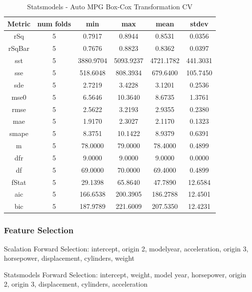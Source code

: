 \documentclass{article}
\begin{document}
\begin{table}[H]
\centering
\caption{Statsmodels - Auto MPG Box-Cox Transformation CV}
\label{tab:Statsmodels - Auto MPG Box-Cox Transformation CV}
\begin{tabular}{|c|c|c|c|c|c|}\hline
Metric & num folds & min & max & mean & stdev \\ \hline \hline
rSq & 5 & 0.7917 & 0.8944 & 0.8531 & 0.0356 \\ \hline
rSqBar & 5 & 0.7676 & 0.8823 & 0.8362 & 0.0397 \\ \hline
sst & 5 & 3880.9704 & 5093.9237 & 4721.1782 & 441.3031 \\ \hline
sse & 5 & 518.6048 & 808.3934 & 679.6400 & 105.7450 \\ \hline
sde & 5 & 2.7219 & 3.4228 & 3.1201 & 0.2536 \\ \hline
mse0 & 5 & 6.5646 & 10.3640 & 8.6735 & 1.3761 \\ \hline
rmse & 5 & 2.5622 & 3.2193 & 2.9355 & 0.2380 \\ \hline
mae & 5 & 1.9170 & 2.3027 & 2.1170 & 0.1323 \\ \hline
smape & 5 & 8.3751 & 10.1422 & 8.9379 & 0.6391 \\ \hline
m & 5 & 78.0000 & 79.0000 & 78.4000 & 0.4899 \\ \hline
dfr & 5 & 9.0000 & 9.0000 & 9.0000 & 0.0000 \\ \hline
df & 5 & 69.0000 & 70.0000 & 69.4000 & 0.4899 \\ \hline
fStat & 5 & 29.1398 & 65.8640 & 47.7890 & 12.6584 \\ \hline
aic & 5 & 166.6538 & 200.3905 & 186.2788 & 12.4501 \\ \hline
bic & 5 & 187.9789 & 221.6009 & 207.5350 & 12.4231 \\ \hline
\end{tabular}
\end{table}

\subsubsection{Feature Selection}

Scalation Forward Selection: intercept, origin 2, modelyear, acceleration, origin 3, horsepower, displacement, cylinders, weight

Statsmodels Forward Selection: intercept, weight, model year, horsepower, origin 2, origin 3, displacement, cylinders, acceleration
\end{document}
